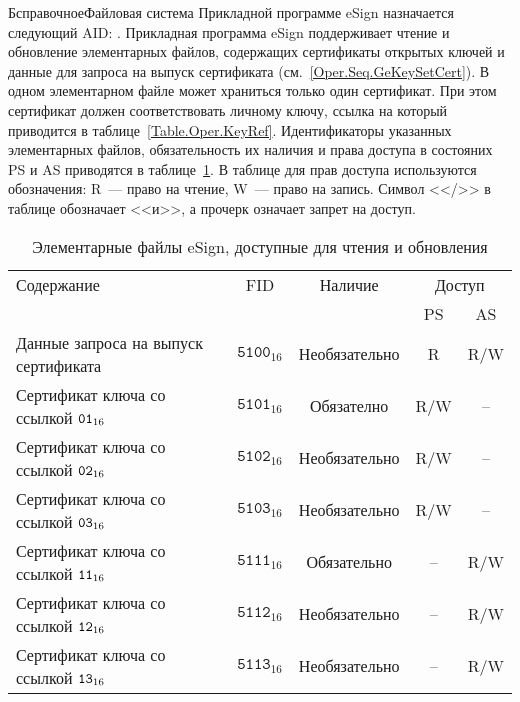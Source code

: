 \begin{appendix}{Б}{справочное}{Файловая система}
Прикладной программе eSign назначается следующий AID: 
. 
%
Прикладная программа eSign поддерживает чтение и обновление 
элементарных файлов, содержащих сертификаты открытых ключей и данные для
запроса на выпуск сертификата (см.~\ref{Oper.Seq.GeKeySetCert}). 
В одном элементарном файле может храниться только один
сертификат. При этом сертификат должен
соответствовать личному ключу, ссылка на который приводится
в таблице~\ref{Table.Oper.KeyRef}.
Идентификаторы указанных элементарных файлов, обязательность
их наличия и права доступа в состояних PS и AS
приводятся в таблице~\ref{Table.FILES.EFSIGN}.
В таблице для прав доступа используются обозначения: 
R~--- право на чтение, W~--- право на запись.
Символ <</>> в таблице обозначает <<и>>, а прочерк означает
запрет на доступ.
 
\begin{table}[H]
\caption{Элементарные файлы eSign, доступные для чтения и обновления}
\label{Table.FILES.EFSIGN}
\begin{tabular}{|l|c|c|c|c|}
\hline
Содержание & FID & Наличие & \multicolumn{2}{|c|}{Доступ}\\
\cline{4-5}
& & & PS & AS \\
\hline
\hline
Данные запроса на выпуск сертификата & 
$\texttt{5100}_{16}$ & Необязательно &  R & R/W \\
\hline
Сертификат ключа со ссылкой $\texttt{01}_{16}$ & 
$\texttt{5101}_{16}$ & Обязателно & R/W & -- \\
\hline
Сертификат ключа со ссылкой $\texttt{02}_{16}$ & 
$\texttt{5102}_{16}$ & Необязательно & R/W & -- \\
\hline
Сертификат ключа со ссылкой $\texttt{03}_{16}$ & 
$\texttt{5103}_{16}$ & Необязательно & R/W & -- \\
\hline
Сертификат ключа со ссылкой $\texttt{11}_{16}$ & 
$\texttt{5111}_{16}$ & Обязательно & -- & R/W \\
\hline
Сертификат ключа со ссылкой $\texttt{12}_{16}$ & 
$\texttt{5112}_{16}$ & Необязательно &  -- & R/W \\
\hline
Сертификат ключа со ссылкой $\texttt{13}_{16}$ & 
$\texttt{5113}_{16}$ & Необязательно & -- & R/W \\
\hline
\end{tabular}
\end{table}

\mbox{}
\vfill
\mbox{}
\clearpage


\end{appendix}